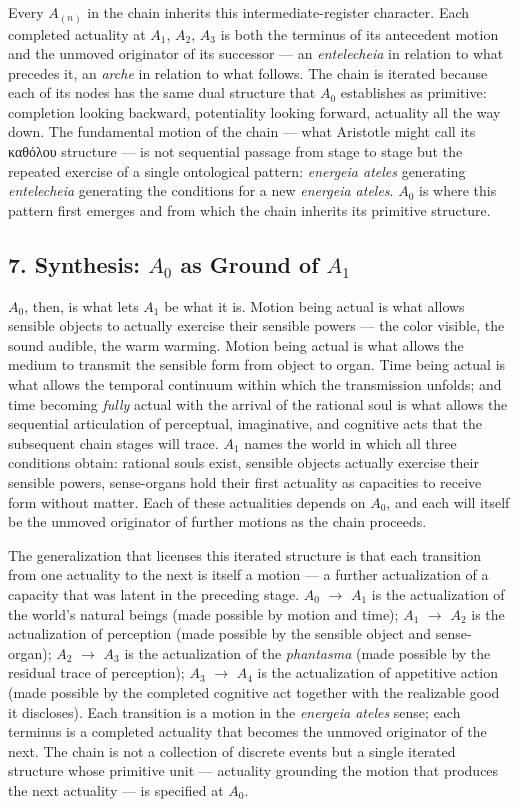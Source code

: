 \documentclass[12pt]{article}
\newcommand{\gk}[1]{{\greekfont #1}}%
\newcommand{\gk}[1]{{\greekfont #1}}%
\newcommand{\gk}[1]{#1}%
\begin{document}
Every $A_{(n)}$ in the chain inherits this intermediate-register character. Each completed actuality at $A_1$, $A_2$, $A_3$ is both the terminus of its antecedent motion and the unmoved originator of its successor --- an \textit{entelecheia} in relation to what precedes it, an \textit{arche} in relation to what follows. The chain is iterated because each of its nodes has the same dual structure that $A_0$ establishes as primitive: completion looking backward, potentiality looking forward, actuality all the way down. The fundamental motion of the chain --- what Aristotle might call its \gk{καθόλου} structure --- is not sequential passage from stage to stage but the repeated exercise of a single ontological pattern: \textit{energeia ateles} generating \textit{entelecheia} generating the conditions for a new \textit{energeia ateles}. $A_0$ is where this pattern first emerges and from which the chain inherits its primitive structure.

\subsection*{7. Synthesis: $A_0$ as Ground of $A_1$}

$A_0$, then, is what lets $A_1$ be what it is. Motion being actual is what allows sensible objects to actually exercise their sensible powers --- the color visible, the sound audible, the warm warming. Motion being actual is what allows the medium to transmit the sensible form from object to organ. Time being actual is what allows the temporal continuum within which the transmission unfolds; and time becoming \textit{fully} actual with the arrival of the rational soul is what allows the sequential articulation of perceptual, imaginative, and cognitive acts that the subsequent chain stages will trace. $A_1$ names the world in which all three conditions obtain: rational souls exist, sensible objects actually exercise their sensible powers, sense-organs hold their first actuality as capacities to receive form without matter. Each of these actualities depends on $A_0$, and each will itself be the unmoved originator of further motions as the chain proceeds.

The generalization that licenses this iterated structure is that each transition from one actuality to the next is itself a motion --- a further actualization of a capacity that was latent in the preceding stage. $A_0$ $\to$ $A_1$ is the actualization of the world's natural beings (made possible by motion and time); $A_1$ $\to$ $A_2$ is the actualization of perception (made possible by the sensible object and sense-organ); $A_2$ $\to$ $A_3$ is the actualization of the \textit{phantasma} (made possible by the residual trace of perception); $A_3$ $\to$ $A_4$ is the actualization of appetitive action (made possible by the completed cognitive act together with the realizable good it discloses). Each transition is a motion in the \textit{energeia ateles} sense; each terminus is a completed actuality that becomes the unmoved originator of the next. The chain is not a collection of discrete events but a single iterated structure whose primitive unit --- actuality grounding the motion that produces the next actuality --- is specified at $A_0$.
\end{document}
